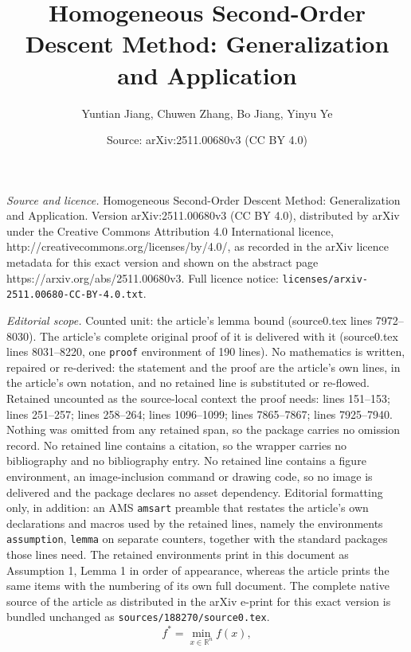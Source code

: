 \documentclass[10pt,a4paper]{amsart}
\title{Homogeneous Second-Order Descent Method: Generalization and Application}
\author{Yuntian Jiang, Chuwen Zhang, Bo Jiang, Yinyu Ye}
\date{Source: arXiv:2511.00680v3 (CC BY 4.0)}
\begin{document}
\maketitle

\noindent\emph{Source and licence.} Homogeneous Second-Order Descent Method: Generalization and Application. Version arXiv:2511.00680v3 (CC BY 4.0), distributed by arXiv under the Creative Commons Attribution 4.0 International licence, http://creativecommons.org/licenses/by/4.0/, as recorded in the arXiv licence metadata for this exact version and shown on the abstract page https://arxiv.org/abs/2511.00680v3. Full licence notice: \texttt{licenses/arxiv-2511.00680-CC-BY-4.0.txt}.\par\smallskip

\noindent\textit{Editorial scope.} Counted unit: the article's lemma bound (source0.tex lines 7972--8030). The article's complete original proof of it is delivered with it (source0.tex lines 8031--8220, one \texttt{proof} environment of 190 lines). No mathematics is written, repaired or re-derived: the statement and the proof are the article's own lines, in the article's own notation, and no retained line is substituted or re-flowed.  Retained uncounted as the source-local context the proof needs: lines 151--153; lines 251--257; lines 258--264; lines 1096--1099; lines 7865--7867; lines 7925--7940.  Nothing was omitted from any retained span, so the package carries no omission record.  No retained line contains a citation, so the wrapper carries no bibliography and no bibliography entry.  No retained line contains a figure environment, an image-inclusion command or drawing code, so no image is delivered and the package declares no asset dependency.  Editorial formatting only, in addition: an AMS \texttt{amsart} preamble that restates the article's own declarations and macros used by the retained lines, namely the environments \texttt{assumption}, \texttt{lemma} on separate counters, together with the standard packages those lines need.  The retained environments print in this document as Assumption 1, Lemma 1 in order of appearance, whereas the article prints the same items with the numbering of its own full document.  The complete native source of the article as distributed in the arXiv e-print for this exact version is bundled unchanged as \texttt{sources/188270/source0.tex}.
\begin{equation} \label{eq.main problem}
    f^* = \min_{x\in \mathbb{R}^n} f(x),
\end{equation}
\end{document}
